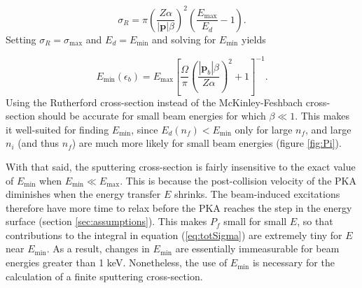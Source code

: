 \documentclass{article}
\begin{document}
\begin{equation}
  \sigma_R
  =
  \pi\left(\frac{Z\alpha}{|\mathbf{p}|\beta}\right)^2
  \left(\frac{E_\text{max}}{E_d} - 1\right).
  \label{eq:Rutherford}
\end{equation}
%
Setting $\sigma_R=\sigma_\text{max}$ and $E_d=E_\text{min}$ and solving for
$E_\text{min}$ yields

\begin{equation}
  E_\text{min}(\epsilon_b)
  =
  E_\text{max}
  \left[\frac{\Omega}{\pi}
    \left(\frac{|\mathbf{p}_b|\beta}{Z\alpha}\right)^2 + 1
  \right]^{-1}.
  \label{eq:Emin}
\end{equation}
%
Using the Rutherford cross-section instead of the McKinley-Feshbach cross-
section should be accurate for small beam energies for which $\beta\ll 1$.
This makes it well-suited for finding $E_\text{min}$, since
$E_d(n_f)<E_\text{min}$ only for large $n_f$, and large $n_i$ (and thus $n_f$)
are much more likely for small beam energies (figure \ref{fig:Pi}).

With that said, the sputtering cross-section is fairly insensitive to the exact
value of $E_\text{min}$ when $E_\text{min} \ll E_\text{max}$.
This is because the post-collision velocity of the PKA diminishes when the
energy transfer $E$ shrinks.
The beam-induced excitations therefore have more time to relax before the PKA
reaches the step in the energy surface (section \ref{sec:assumptions}).
This makes $P_f$ small for small $E$, so that contributions to the integral in
equation (\ref{eq:totSigma}) are extremely tiny for $E$ near $E_\text{min}$.
As a result, changes in $E_\text{min}$ are essentially immeasurable for beam
energies greater than 1 keV.
Nonetheless, the use of $E_\text{min}$ is necessary for the calculation of a
finite sputtering cross-section.




\end{document}
